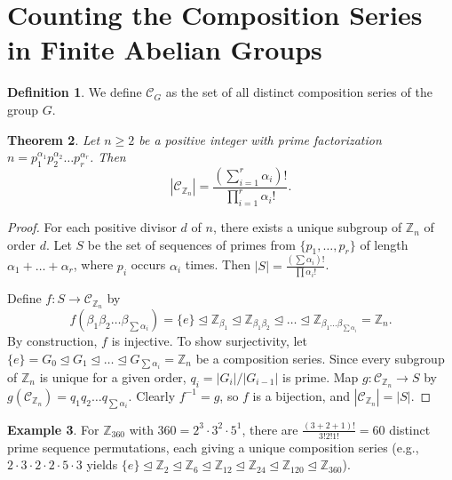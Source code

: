 \documentclass[11pt,a4paper]{article}
\newtheorem{theorem}{Theorem}[section]
\theoremstyle{definition}
\newtheorem{definition}[theorem]{Definition}
\newtheorem{example}[theorem]{Example}
\begin{document}
\section{Counting the Composition Series in Finite Abelian Groups}

\begin{definition}
We define $\mathcal{C}_G$ as the set of all distinct composition series of the group $G$.
\end{definition}

\begin{theorem}\label{thm3.2}
Let $n \ge 2$ be a positive integer with prime factorization $n = p_1^{\alpha_1} p_2^{\alpha_2} \dots p_r^{\alpha_r}$. Then
\[
|\mathcal{C}_{\mathbb{Z}_n}| = \frac{(\sum_{i=1}^r \alpha_i)!}{\prod_{i=1}^r \alpha_i!}.
\]
\end{theorem}

\begin{proof}
For each positive divisor $d$ of $n$, there exists a unique subgroup of $\mathbb{Z}_n$ of order $d$. Let $S$ be the set of sequences of primes from $\{p_1, \dots, p_r\}$ of length $\alpha_1 + \dots + \alpha_r$, where $p_i$ occurs $\alpha_i$ times. Then $|S| = \frac{(\sum \alpha_i)!}{\prod \alpha_i!}$.

Define $f : S \to \mathcal{C}_{\mathbb{Z}_n}$ by
\[
f(\beta_1 \beta_2 \dots \beta_{\sum \alpha_i}) = \{e\} \unlhd \mathbb{Z}_{\beta_1} \unlhd \mathbb{Z}_{\beta_1 \beta_2} \unlhd \dots \unlhd \mathbb{Z}_{\beta_1 \dots \beta_{\sum \alpha_i}} = \mathbb{Z}_n.
\]
By construction, $f$ is injective. To show surjectivity, let $\{e\} = G_0 \unlhd G_1 \unlhd \dots \unlhd G_{\sum \alpha_i} = \mathbb{Z}_n$ be a composition series. Since every subgroup of $\mathbb{Z}_n$ is unique for a given order, $q_i = |G_i| / |G_{i-1}|$ is prime. Map $g : \mathcal{C}_{\mathbb{Z}_n} \to S$ by $g(\mathcal{C}_{\mathbb{Z}_n}) = q_1 q_2 \dots q_{\sum \alpha_i}$. Clearly $f^{-1} = g$, so $f$ is a bijection, and $|\mathcal{C}_{\mathbb{Z}_n}| = |S|$.
\end{proof}

\begin{example}
For $\mathbb{Z}_{360}$ with $360 = 2^3 \cdot 3^2 \cdot 5^1$, there are $\frac{(3+2+1)!}{3! 2! 1!} = 60$ distinct prime sequence permutations, each giving a unique composition series (e.g., $2 \cdot 3 \cdot 2 \cdot 2 \cdot 5 \cdot 3$ yields $\{e\} \unlhd \mathbb{Z}_2 \unlhd \mathbb{Z}_6 \unlhd \mathbb{Z}_{12} \unlhd \mathbb{Z}_{24} \unlhd \mathbb{Z}_{120} \unlhd \mathbb{Z}_{360}$).
\end{example}
\end{document}
